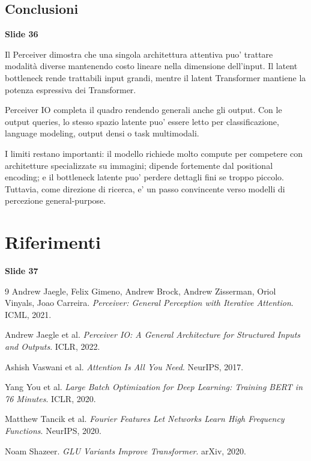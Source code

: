 \documentclass[11pt,a4paper]{article}
\newcommand{\slide}[1]{\textcolor{mainblue}{\textbf{Slide #1}}}
\begin{document}
\subsection{Conclusioni}
\slide{36}

Il Perceiver dimostra che una singola architettura attentiva puo' trattare
modalit\`a diverse mantenendo costo lineare nella dimensione dell'input. Il
latent bottleneck rende trattabili input grandi, mentre il latent Transformer
mantiene la potenza espressiva dei Transformer.

Perceiver IO completa il quadro rendendo generali anche gli output. Con le
output queries, lo stesso spazio latente puo' essere letto per classificazione,
language modeling, output densi o task multimodali.

I limiti restano importanti: il modello richiede molto compute per competere
con architetture specializzate su immagini; dipende fortemente dal positional
encoding; e il bottleneck latente puo' perdere dettagli fini se troppo piccolo.
Tuttavia, come direzione di ricerca, e' un passo convincente verso modelli di
percezione general-purpose.

\section{Riferimenti}
\slide{37}

\begin{thebibliography}{9}
Andrew Jaegle, Felix Gimeno, Andrew Brock, Andrew Zisserman, Oriol Vinyals,
Joao Carreira.
\newblock \emph{Perceiver: General Perception with Iterative Attention}.
\newblock ICML, 2021.

Andrew Jaegle et al.
\newblock \emph{Perceiver IO: A General Architecture for Structured Inputs and Outputs}.
\newblock ICLR, 2022.

Ashish Vaswani et al.
\newblock \emph{Attention Is All You Need}.
\newblock NeurIPS, 2017.

Yang You et al.
\newblock \emph{Large Batch Optimization for Deep Learning: Training BERT in 76 Minutes}.
\newblock ICLR, 2020.

Matthew Tancik et al.
\newblock \emph{Fourier Features Let Networks Learn High Frequency Functions}.
\newblock NeurIPS, 2020.

Noam Shazeer.
\newblock \emph{GLU Variants Improve Transformer}.
\newblock arXiv, 2020.
\end{thebibliography}
\end{document}
